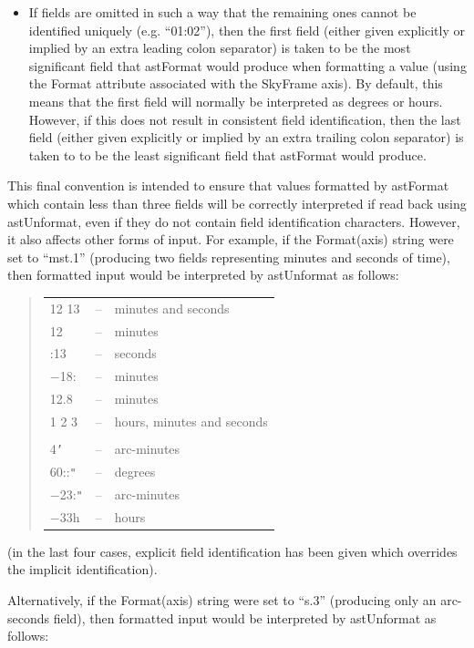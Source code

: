\documentclass[twoside,11pt]{article}
\newcommand{\htmlref}[2]{#1}
\begin{document}
\begin{itemize}
\item If fields are omitted in such a way that the remaining ones
cannot be identified uniquely (e.g. ``01:02''), then the first field
(either given explicitly or implied by an extra leading colon
separator) is taken to be the most significant field that astFormat
would produce when formatting a value (using the Format attribute
associated with the SkyFrame axis). By default, this means that the
first field will normally be interpreted as degrees or hours. However,
if this does not result in consistent field identification, then the
last field (either given explicitly or implied by an extra trailing
colon separator) is taken to to be the least significant field that
astFormat would produce.

\end{itemize}

This final convention is intended to ensure that values formatted by
astFormat which contain less than three fields will be correctly
interpreted if read back using astUnformat, even if they do not
contain field identification characters.  However, it also affects
other forms of input. For example, if the \htmlref{Format(axis)}{Formataxis} string were set
to ``mst.1'' (producing two fields representing minutes and seconds of
time), then formatted input would be interpreted by astUnformat as
follows:

\begin{quote}
\begin{tabular}{lll}
12 13 & -- & minutes and seconds \\
12 & -- & minutes \\
:13 & -- & seconds \\
$-$18: & -- & minutes \\
12.8 & -- & minutes \\
1 2 3 & -- & hours, minutes and seconds \\
& & \\
4{\tt{'}} & -- & arc-minutes \\
60::{\tt{"}} & -- & degrees \\
$-$23:{\tt{"}} & -- & arc-minutes \\
$-$33h & -- & hours
\end{tabular}
\end{quote}

(in the last four cases, explicit field identification has been given
which overrides the implicit identification).

Alternatively, if the Format(axis) string were set to ``s.3''
(producing only an arc-seconds field), then formatted input would be
interpreted by astUnformat as follows:
\end{document}
